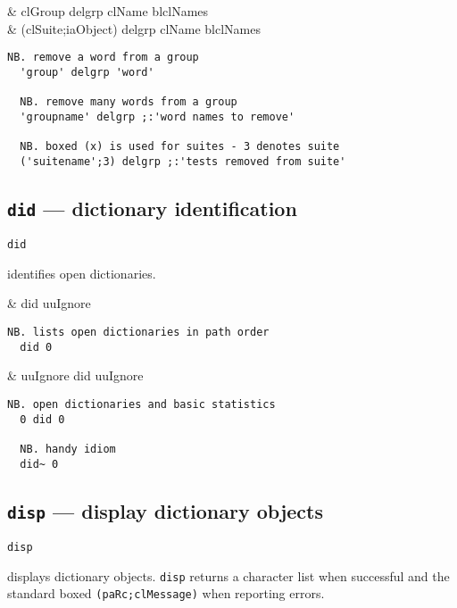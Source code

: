 \begin{wordhead}
\dyad & clGroup delgrp clName \argsep blclNames \\
      & (clSuite;iaObject) delgrp clName \argsep blclNames \\
\end{wordhead}
\begin{lstlisting}[frame=single,framerule=0pt]
  NB. remove a word from a group
  'group' delgrp 'word' 

  NB. remove many words from a group 
  'groupname' delgrp ;:'word names to remove'

  NB. boxed (x) is used for suites - 3 denotes suite
  ('suitename';3) delgrp ;:'tests removed from suite'
\end{lstlisting}

 
\subsection{\texttt{did} --- dictionary identification}\label{ss:did}

\hypertarget{il:did}{\texttt{did}} identifies open dictionaries. 

\begin{wordhead}
\monad & did uuIgnore \\
\end{wordhead}
\begin{lstlisting}[frame=single,framerule=0pt]
  NB. lists open dictionaries in path order 
  did 0 
\end{lstlisting}

\begin{wordhead}
\dyad & uuIgnore did uuIgnore \\
\end{wordhead}
\begin{lstlisting}[frame=single,framerule=0pt]
  NB. open dictionaries and basic statistics 
  0 did 0  

  NB. handy idiom 
  did~ 0    
\end{lstlisting}

\subsection{\texttt{disp} --- display dictionary objects}\label{ss:disp} 

\hypertarget{il:disp}{\texttt{disp}} displays dictionary objects. \texttt{disp} returns a character 
list when successful and the standard boxed \verb|(paRc;clMessage)| when reporting errors. 

